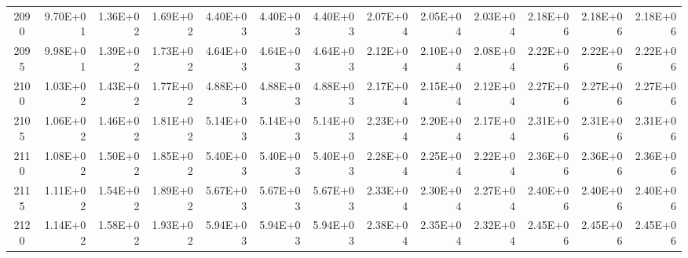 \documentclass{article}
\begin{document}
\begin{table}
\begin{tabular}{crrr|rrr|rrr|rrr}
2090     & 9.70E+01 & 1.36E+02 & 1.69E+02 & 4.40E+03 & 4.40E+03 & 4.40E+03 & 2.07E+04 & 2.05E+04 & 2.03E+04 & 2.18E+06 & 2.18E+06 & 2.18E+06 \\
2095     & 9.98E+01 & 1.39E+02 & 1.73E+02 & 4.64E+03 & 4.64E+03 & 4.64E+03 & 2.12E+04 & 2.10E+04 & 2.08E+04 & 2.22E+06 & 2.22E+06 & 2.22E+06 \\
2100     & 1.03E+02 & 1.43E+02 & 1.77E+02 & 4.88E+03 & 4.88E+03 & 4.88E+03 & 2.17E+04 & 2.15E+04 & 2.12E+04 & 2.27E+06 & 2.27E+06 & 2.27E+06 \\
2105     & 1.06E+02 & 1.46E+02 & 1.81E+02 & 5.14E+03 & 5.14E+03 & 5.14E+03 & 2.23E+04 & 2.20E+04 & 2.17E+04 & 2.31E+06 & 2.31E+06 & 2.31E+06 \\
2110     & 1.08E+02 & 1.50E+02 & 1.85E+02 & 5.40E+03 & 5.40E+03 & 5.40E+03 & 2.28E+04 & 2.25E+04 & 2.22E+04 & 2.36E+06 & 2.36E+06 & 2.36E+06 \\
2115     & 1.11E+02 & 1.54E+02 & 1.89E+02 & 5.67E+03 & 5.67E+03 & 5.67E+03 & 2.33E+04 & 2.30E+04 & 2.27E+04 & 2.40E+06 & 2.40E+06 & 2.40E+06 \\
2120     & 1.14E+02 & 1.58E+02 & 1.93E+02 & 5.94E+03 & 5.94E+03 & 5.94E+03 & 2.38E+04 & 2.35E+04 & 2.32E+04 & 2.45E+06 & 2.45E+06 & 2.45E+06
\end{tabular}
\end{table}
\end{document}
